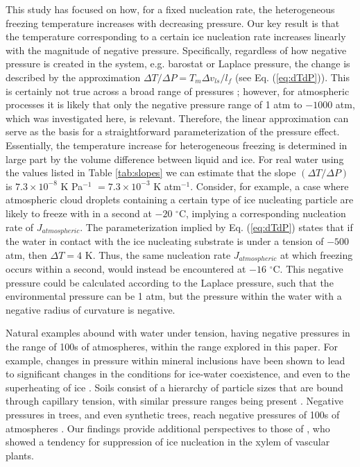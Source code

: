 \documentclass[journal abbreviation, manuscript]{copernicus}
\begin{document}
This study has focused on how, for a fixed nucleation rate, the heterogeneous freezing temperature increases with decreasing pressure. Our key result is that the temperature corresponding to a certain ice nucleation rate increases linearly with the magnitude of negative pressure. Specifically, regardless of how negative pressure is created in the system, e.g. barostat or Laplace pressure, the change is described by the approximation $\Delta T/\Delta P = T_m \Delta v_{ls} / l_f$ (see Eq. (\ref{eq:dTdP})). This is certainly not true across a broad range of pressures \citep[e.g.,][]{bianco2021, espinosa2016}; however, for atmospheric processes it is likely that only the negative pressure range of 1 atm to $-1000$ atm, which was investigated here, is relevant. Therefore, the linear approximation can serve as the basis for a straightforward parameterization of the pressure effect. Essentially, the temperature increase for heterogeneous freezing is determined in large part by the volume difference between liquid and ice. For real water using the values listed in Table \ref{tab:slopes} we can estimate that the slope $(\Delta T/\Delta P)$ is $7.3 \times 10^{-8}$ K Pa$^{-1}$ $= 7.3 \times 10^{-3}$ K atm$^{-1}$. Consider, for example, a case where atmospheric cloud droplets containing a certain type of ice nucleating particle are likely to freeze with in a second at $-20$ $^\circ$C, implying a corresponding nucleation rate of $J_{atmospheric}$. The parameterization implied by Eq. (\ref{eq:dTdP}) states that if the water in contact with the ice nucleating substrate is under a tension of $-500$ atm, then $\Delta T = 4$ K. Thus, the same nucleation rate $J_{atmospheric}$ at which freezing occurs within a second, would instead be encountered at $-16$ $^\circ$C. This negative pressure could be calculated according to the Laplace pressure, such that the environmental pressure can be 1 atm, but the pressure within the water with a negative radius of curvature is negative.

Natural examples abound with water under tension, having negative pressures in the range of 100s of atmospheres, within the range explored in this paper. For example, changes in pressure within mineral inclusions have been shown to lead to significant changes in the conditions for ice-water coexistence, and even to the superheating of ice \citep{roedder1967metastable}. Soils consist of a hierarchy of particle sizes that are bound through capillary tension, with similar pressure ranges being present \citep{seiphoori2020}. Negative pressures in trees, and even synthetic trees, reach negative pressures of 100s of atmospheres \citep{wheeler2008transpiration}. Our findings provide additional perspectives to those of \citet{lintunen2013anatomical}, who showed a tendency for suppression of ice nucleation in the xylem of vascular plants. 
\end{document}
